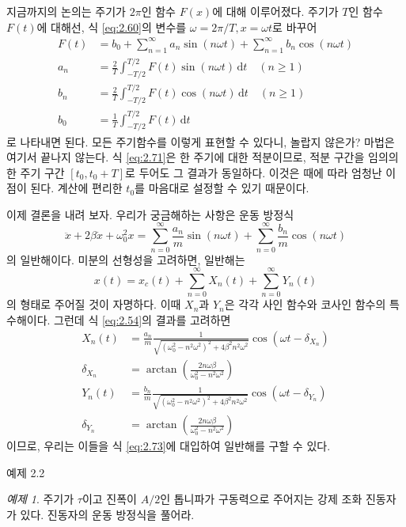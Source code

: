 \documentclass[chapter, oneside, b5paper]{oblivoir}
\theoremstyle{plain}
\theoremstyle{definition}
\theoremstyle{remark}
\newtheorem{example}{예제}[chapter]    %
\begin{document}
지금까지의 논의는 주기가 $2\pi$인 함수 $F(x)$에 대해 이루어졌다. 주기가 $T$인 함수 $F(t)$에 대해선, 식 \ref{eq:2.60}의 변수를 $\omega = 2\pi / T, x=\omega t$로 바꾸어
\begin{equation}
\begin{aligned}
    F(t) &= b_{0} + \sum_{n=1}^{\infty} a_{n}\sin(n\omega t) + \sum_{n=1}^{\infty} b_{n}\cos(n\omega t) \\
    a_{n} &= \frac{2}{T} \int_{-T/2}^{T/2} F(t)\sin(n\omega t)\,\mathrm{d}t \quad (n \ge 1) \\
    b_{n} &= \frac{2}{T} \int_{-T/2}^{T/2} F(t)\cos(n\omega t)\,\mathrm{d}t \quad (n \ge 1) \\ 
    b_{0} &= \frac{1}{T} \int_{-T/2}^{T/2} F(t)\,\mathrm{d}t \label{eq:2.71}
\end{aligned}
\end{equation}
로 나타내면 된다. 모든 주기함수를 이렇게 표현할 수 있다니, 놀랍지 않은가? 마법은 여기서 끝나지 않는다. 식 \ref{eq:2.71}은 한 주기에 대한 적분이므로, 적분 구간을 임의의 한 주기 구간 $[t_0, t_0 + T]$로 두어도 그 결과가 동일하다. 이것은 때에 따라 엄청난 이점이 된다. 계산에 편리한 $t_0$를 마음대로 설정할 수 있기 때문이다.

이제 결론을 내려 보자. 우리가 궁금해하는 사항은 운동 방정식
\begin{equation}
    \ddot{x} + 2\beta \dot{x} + \omega_0^2 x = \sum_{n=0}^{\infty}\frac{a_n}{m}\sin{(n\omega t)} + \sum_{n=0}^{\infty}\frac{b_n}{m}\cos{(n \omega t)}
\end{equation} \label{eq:T driv}
의 일반해이다. 미분의 선형성을 고려하면, 일반해는
\begin{equation}
    x(t) = x_c(t) + \sum_{n=0}^{\infty}X_n(t) + \sum_{n=0}^{\infty}Y_n(t) \label{eq:2.73}
\end{equation}
의 형태로 주어질 것이 자명하다. 이때 $X_n$과 $Y_n$은 각각 사인 함수와 코사인 함수의 특수해이다. 그런데 식 \ref{eq:2.54}의 결과를 고려하면
\begin{equation}
    \begin{aligned}
        X_n(t) &= \frac{a_n}{m}\frac{1}{\sqrt{(\omega_0^2-n^2\omega^2)^2+4\beta^2 n^2 \omega^2}} \cos{(\omega t-\delta_{X_n})} \\ \delta_{X_n} &= \arctan{\left(\frac{2n\omega \beta}{\omega_0^2-n^2\omega^2}\right)} \\
        Y_n(t) &= \frac{b_n}{m}\frac{1}{\sqrt{(\omega_0^2-n^2\omega^2)^2+4\beta^2 n^2 \omega^2}} \cos{(\omega t-\delta_{Y_n})} \\ \delta_{Y_n} &= \arctan{\left(\frac{2n\omega \beta}{\omega_0^2-n^2\omega^2}\right)}
        \label{eq:2.74}
    \end{aligned}
\end{equation}
이므로, 우리는 이들을 식 \ref{eq:2.73}에 대입하여 일반해를 구할 수 있다.
\begin{examplebox}{예제 2.2}
\begin{example}
주기가 $\tau$이고 진폭이 $A/2$인 톱니파가 구동력으로 주어지는 강제 조화 진동자가 있다. 진동자의 운동 방정식을 풀어라.
\end{example}
\end{examplebox}
\end{document}
